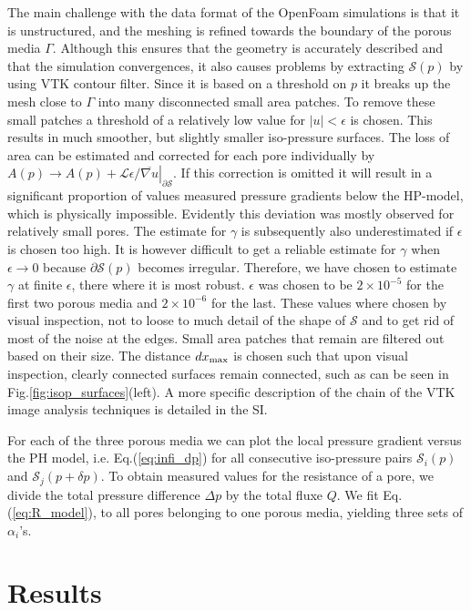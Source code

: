 \documentclass[draft]{agujournal2019}
\begin{document}
The main challenge with the data format of the OpenFoam simulations is that it is unstructured, and the meshing is refined towards the boundary of the porous media $\Gamma$. Although this ensures that the geometry is accurately described and that the simulation convergences, it also causes problems by extracting $\mathcal{S}(p)$ by using VTK contour filter. Since it is based on a threshold on $p$ it breaks up the mesh close to $\Gamma$ into many disconnected small area patches. To remove these small patches a threshold of a relatively low value for $\left|u\right|< \epsilon$ is chosen. This results in much smoother, but slightly smaller iso-pressure surfaces. The loss of area can be estimated and corrected for each pore individually by $A(p)\rightarrow A(p) + \left.\mathcal{L}\epsilon/\overline{\nabla u}\right|_{\partial \mathcal{S}}$. If this correction is omitted it will result in a significant proportion of values measured pressure gradients below the HP-model, which is physically impossible. Evidently this deviation was mostly observed for relatively small pores. The estimate for $\gamma$ is subsequently also underestimated if $\epsilon$ is chosen too high. It is however difficult to get a reliable estimate for $\gamma$ when $\epsilon \rightarrow 0$ because $\partial \mathcal{S}(p)$ becomes irregular. Therefore, we have chosen to estimate $\gamma$  at finite $\epsilon$, there where it is most robust. $\epsilon$ was chosen to be $2\times10^{-5}$ for the first two porous media and $2\times10^{-6}$ for the last. These values where chosen by visual inspection, not to loose to much detail of the shape of $\mathcal{S}$ and to get rid of most of the noise at the edges. Small area patches that remain are filtered out based on their size. The distance $dx_{\rm{max}}$ is chosen such that upon visual inspection, clearly connected surfaces remain connected, such as can be seen in Fig.\ref{fig:isop_surfaces}(left). A more specific description of the chain of the VTK image analysis techniques is detailed in the SI. 

For each of the three porous media we can plot the local pressure gradient versus the PH model, i.e. Eq.(\ref{eq:infi_dp}) for all consecutive iso-pressure pairs $\mathcal{S}_i(p)$ and $\mathcal{S}_j(p+\delta p)$. To obtain measured values for the resistance of a pore, we divide the total pressure difference $\Delta p$ by the total fluxe $Q$. We fit Eq.(\ref{eq:R_model}), to all pores belonging to one porous media, yielding three sets of $\alpha_i$'s.  


\section{Results}
\end{document}
